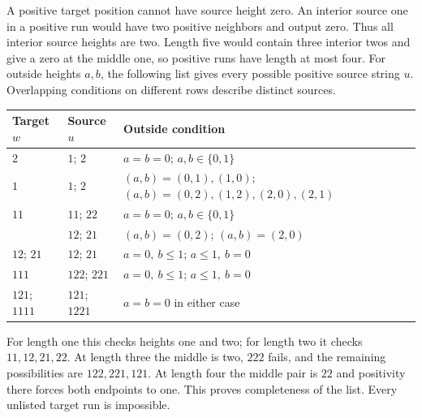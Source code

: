 A positive target position cannot have source height zero. An interior
source one in a positive run would have two positive neighbors and
output zero. Thus all interior source heights are two. Length five
would contain three interior twos and give a zero at the middle one,
so positive runs have length at most four. For outside heights $a,b$,
the following list gives every possible positive source string $u$.
Overlapping conditions on different rows describe distinct sources.
\begin{center}\small
\begin{tabular}{lll}
\toprule
Target $w$ & Source $u$ & Outside condition\\
\midrule
$2$ & $1$; $2$ & $a=b=0$; $a,b\in\{0,1\}$\\
$1$ & $1$; $2$ & $(a,b)=(0,1),(1,0)$; $(a,b)=(0,2),(1,2),(2,0),(2,1)$\\
$11$ & $11$; $22$ & $a=b=0$; $a,b\in\{0,1\}$\\
 & $12$; $21$ & $(a,b)=(0,2)$; $(a,b)=(2,0)$\\
$12$; $21$ & $12$; $21$ & $a=0,\ b\le1$; $a\le1,\ b=0$\\
$111$ & $122$; $221$ & $a=0,\ b\le1$; $a\le1,\ b=0$\\
$121$; $1111$ & $121$; $1221$ & $a=b=0$ in either case\\
\bottomrule
\end{tabular}
\end{center}
For length one this checks heights one and two; for length two it
checks $11,12,21,22$. At length three the middle is two, $222$ fails,
and the remaining possibilities are $122,221,121$. At length four the
middle pair is $22$ and positivity there forces both endpoints to one.
This proves completeness of the list. Every unlisted target run is
impossible.

